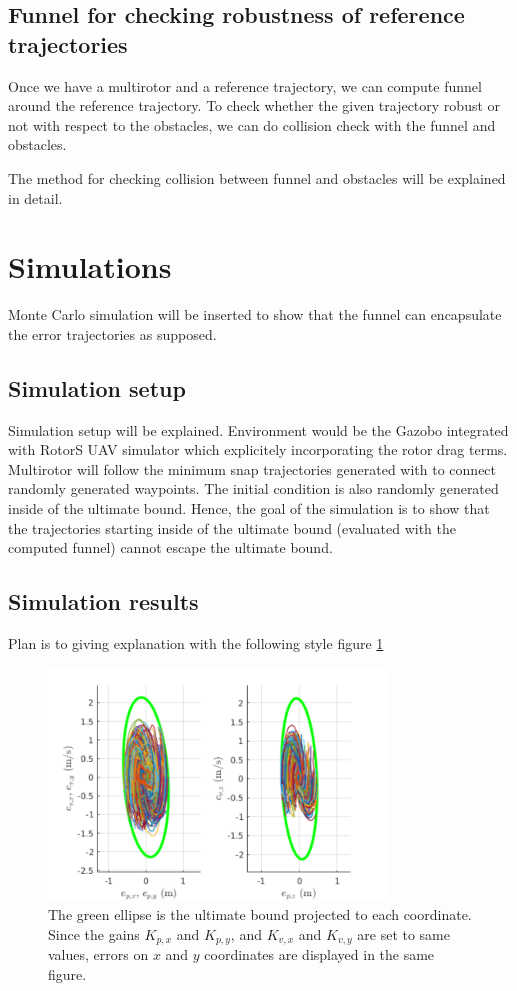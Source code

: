\documentclass[letterpaper, 10 pt, conference]{ieeeconf}  %
\begin{document}
\subsection{Funnel for checking robustness of reference trajectories}
Once we have a multirotor and a reference trajectory, we can compute funnel around the reference trajectory. 
To check whether the given trajectory robust or not with respect to the obstacles, we can do collision check with the funnel and obstacles.

The method for checking collision between funnel and obstacles will be explained in detail.


\section{Simulations}
Monte Carlo simulation will be inserted to show that the funnel can encapsulate the error trajectories as supposed. 
\subsection{Simulation setup}
Simulation setup will be explained. Environment would be the Gazobo integrated with RotorS UAV simulator which explicitely incorporating the rotor drag terms.
Multirotor will follow the minimum snap trajectories generated with to connect randomly generated waypoints.
The initial condition is also randomly generated inside of the ultimate bound. 
Hence, the goal of the simulation is to show that the trajectories starting inside of the ultimate bound (evaluated with the computed funnel) cannot escape the ultimate bound.
\subsection{Simulation results}
Plan is to giving explanation with the following style figure \ref{fig:simulation}
\begin{figure}
\centering
\includegraphics[width=9cm]{monteCarlo.pdf}
\caption{The green ellipse is the ultimate bound projected to each coordinate. 
Since the gains $K_{p,x}$ and $K_{p,y}$, and $K_{v,x}$ and $K_{v,y}$ are set to same values, errors on $x$ and $y$ coordinates are displayed in the same figure.} \label{fig:simulation}
\end{figure}
\end{document}
